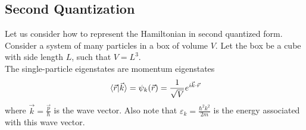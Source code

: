 \documentclass[12pt,a4paper,titlepage]{article}
\begin{document}
\subsection{Second Quantization}
Let us consider how to represent the Hamiltonian in second quantized form. Consider a system of many particles in a box of volume $V$. Let the box be a cube with side length $L$, such that $V=L^{3}$.\\

The single-particle eigenstates are momentum eigenstates
\begin{equation}
\ip*{\vec{r}}{\vec{k}}=\psi_{k}(\vec{r})=\frac{1}{\sqrt{V}}e^{i\vec{k}\cdot\vec{r}}
\end{equation}
where $\vec{k}=\frac{\vec{p}}{\hbar}$ is the wave vector. Also note that $\varepsilon_{k}=\frac{\hbar^{2}k^{2}}{2m}$ is the energy associated with this wave vector.\\
\end{document}
